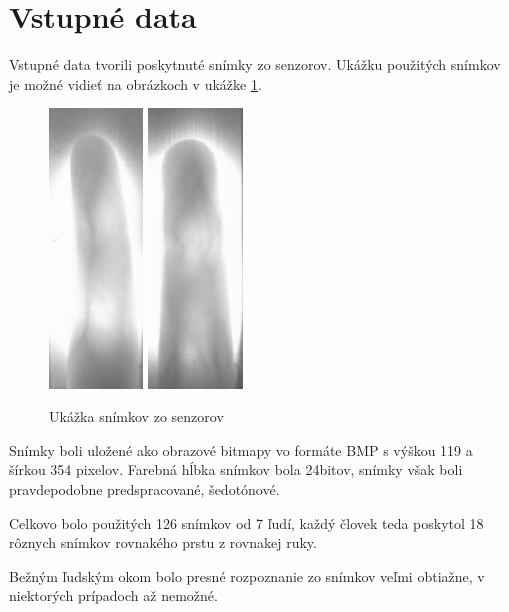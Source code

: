 \documentclass[11pt,a4paper]{article}
\begin{document}
\section{Vstupné data} \label{data}

Vstupné data tvorili poskytnuté snímky zo senzorov. Ukážku použitých snímkov je
možné vidieť na obrázkoch v ukážke \ref{fig:img}. 

\begin{figure}[ht!]
	\centering
	\includegraphics[width=2.5cm]{fig/img1.eps}
	\includegraphics[width=2.5cm]{fig/img2.eps}
	\caption{\label{fig:img} Ukážka snímkov zo senzorov}
\end{figure}

Snímky boli uložené ako obrazové bitmapy vo formáte BMP s výškou 119 a šírkou
354 pixelov. Farebná hĺbka snímkov bola 24bitov, snímky však boli pravdepodobne
predspracované, šedotónové.

Celkovo bolo použitých 126 snímkov od 7 ľudí, každý človek teda poskytol 18
rôznych snímkov rovnakého prstu z rovnakej ruky.

Bežným ľudským okom bolo presné rozpoznanie zo snímkov veľmi obtiažne,
v niektorých prípadoch až nemožné.
\end{document}
